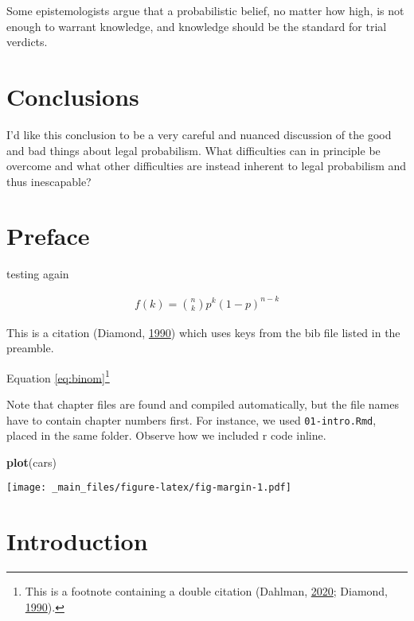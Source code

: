 \documentclass[]{book}
\newenvironment{Shaded}{\begin{snugshade}}{\end{snugshade}}
\newcommand{\KeywordTok}[1]{\textcolor[rgb]{0.13,0.29,0.53}{\textbf{#1}}}
\newcommand{\NormalTok}[1]{#1}
\begin{document}
Some epistemologists argue that a probabilistic belief, no matter how
high, is not enough to warrant knowledge, and knowledge should be the
standard for trial verdicts.

\chapter{Conclusions}

I'd like this conclusion to be a very careful and nuanced discussion of
the good and bad things about legal probabilism. What difficulties can
in principle be overcome and what other difficulties are instead
inherent to legal probabilism and thus inescapable?

\chapter*{Preface}\label{preface}

testing again

\begin{align} 
  f\left(k\right) = \binom{n}{k} p^k\left(1-p\right)^{n-k}
  \label{eq:binom}
\end{align}

This is a citation (Diamond, \protect\hyperlink{ref-diamond90}{1990})
which uses keys from the bib file listed in the preamble.

Equation \eqref{eq:binom}\footnote{This is a footnote containing a double
  citation (Dahlman, \protect\hyperlink{ref-dahlmanNakedStat2020}{2020};
  Diamond, \protect\hyperlink{ref-diamond90}{1990}).}

Note that chapter files are found and compiled automatically, but the
file names have to contain chapter numbers first. For instance, we used
\texttt{01-intro.Rmd}, placed in the same folder. Observe how we
included r code inline.

\begin{Shaded}
\begin{Highlighting}[]
\KeywordTok{plot}\NormalTok{(cars)}
\end{Highlighting}
\end{Shaded}

\texttt{[image: \_main\_files/figure-latex/fig-margin-1.pdf]}

\chapter{Introduction}\label{ch:intro}
\end{document}
